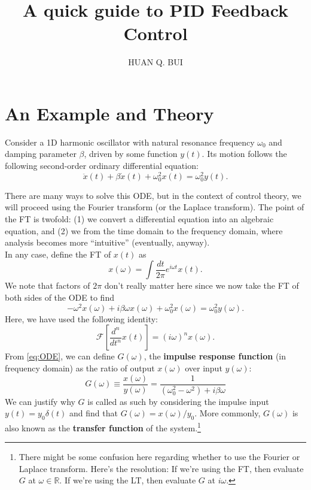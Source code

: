 \documentclass{article}
\theoremstyle{definition}
\newcommand{\F}{\mathcal{F}}
\newcommand{\be}{\beta}
\newcommand{\f}[2]{\frac{#1}{#2}}
\newcommand{\lb}{\left[}
\newcommand{\rb}{\right]}
\begin{document}
\title{A quick guide to PID Feedback Control}
\author{HUAN Q. BUI}	
\maketitle



\section{An Example and Theory}

Consider a 1D harmonic oscillator with natural resonance frequency $\omega_0$ and damping parameter $\beta$, driven by some function $y(t)$. Its motion follows the following second-order ordinary differential equation:
\begin{equation*}
\ddot{x}(t) + \be \dot{x}(t) + \omega_0^2 x(t) = \omega_0^2 y(t).
\end{equation*}

There are many ways to solve this ODE, but in the context of control theory, we will proceed using the Fourier transform (or the Laplace transform). The point of the FT is twofold: (1) we convert a differential equation into an algebraic equation, and (2) we from the time domain to the frequency domain, where analysis becomes more ``intuitive'' (eventually, anyway). \\

In any case, define the FT of $x(t)$ as 
\begin{equation*}
x(\omega) = \int \f{d t }{2\pi } e^{i\omega t} x(t). 
\end{equation*}
We note that factors of $2\pi$ don't really matter here since we now take the FT of both sides of the ODE to find
\begin{equation}\label{eq:ODE}
-\omega^2 x(\omega) + i\beta \omega x(\omega) + \omega_0^2 x(\omega) = \omega_0^2 y(\omega).
\end{equation}
Here, we have used the following identity:
\begin{equation*}
\F\lb \f{d^n }{dt^n} x(t) \rb = (i\omega)^n x(\omega).
\end{equation*}
From \eqref{eq:ODE}, we can define $G(\omega)$, the \textbf{impulse response function} (in frequency domain) as the ratio of output $x(\omega)$ over input $y(\omega)$:
\begin{equation*}
G(\omega) \equiv \f{x(\omega)}{y(\omega)} = \f{1}{(\omega_0^2 - \omega^2) + i\beta \omega}
\end{equation*}
We can justify why $G$ is called as such by considering the impulse input $y(t) = y_0 \delta(t)$ and find that $G(\omega) = x(\omega)/y_0$. More commonly, $G(\omega)$ is also known as the \textbf{transfer function} of the system.\footnote{There might be some confusion here regarding whether to use the Fourier or Laplace transform. Here's the resolution: If we're using the FT, then evaluate $G$ at $\omega\in \mathbb{R}$. If we're using the LT, then evaluate $G$ at $i\omega$.}\\
\end{document}
